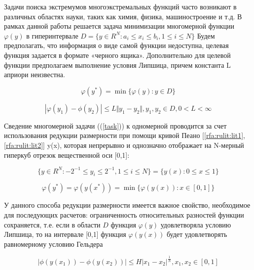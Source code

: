 \documentclass[10pt,a4paper]{book}
\begin{document}
Задачи поиска экстремумов многоэкстремальных функций часто возникают в различных областях науки, таких как химия, физика, машиностроение и т.д. В рамках данной работы решается задача минимизации многомерной функции $\varphi(y)$ в гиперинтервале \(D=\{y\in R^N:a_i\leqslant x_i\leqslant{b_i}, 1\leqslant{i}\leqslant{N}\}\)  Будем предполагать, что информация о виде самой функции недоступна, целевая функция задается в формате «черного ящика». Дополнительно для целевой функции предполагаем выполнение условия Липшица, причем константа L априори неизвестна. 
 
 
\begin{equation}
\label{task}
\varphi(y^*)=\min\{\varphi(y):y\in D\}
\end{equation}

\begin{equation}
\label{lip}
|\varphi(y_1)-\phi(y_2)|\leqslant L\Vert y_1-y_2\Vert,y_1,y_2\in D,0<L<\infty
\end{equation}



 
Сведение многомерной задачи ((\ref{task})) к одномерной проводится за счет использования редукции размерности при помощи кривой Пеано [\ref{rfa:rulit:lit1}, \ref{rfa:rulit:lit2}] y(x), которая непрерывно и однозначно отображает на N-мерный гиперкуб отрезок вещественной оси [0,1]:
 
\begin{equation}
\label{cube}
\lbrace y\in R^N:-2^{-1}\leqslant y_i\leqslant 2^{-1},1\leqslant i\leqslant N\rbrace=\{y(x):0\leqslant x\leqslant 1\}
\end{equation}


\begin{equation}
\label{oneDimTask}
\varphi(y^*)=\varphi(y(x^*))=\min\{\varphi(y(x)):x\in [0,1]\}
\end{equation}

 
 
 У данного способа редукции размерности имеется важное свойство, необходимое для последующих расчетов: ограниченность относительных разностей функции сохраняется, т.е. если в области $D$ функция $\varphi(y)$ удовлетворяла условию Липшица, то на интервале [0,1] функция $\varphi(y(x))$ будет удовлетворять равномерному условию Гельдера
 
\begin{equation}
\label{holder}
|\phi(y(x_1))-\phi(y(x_2))|\leqslant H{|x_1-x_2|}^{\frac{1}{N}},x_1,x_2\in[0,1]
\end{equation}
\end{document}
